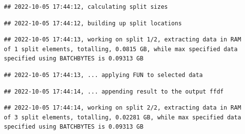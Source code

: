 \documentclass[
  12pt,
]{style/krantz}
\newenvironment{Shaded}{\begin{snugshade}}{\end{snugshade}}
\newcommand{\AttributeTok}[1]{\textcolor[rgb]{0.77,0.63,0.00}{#1}}
\newcommand{\CommentTok}[1]{\textcolor[rgb]{0.56,0.35,0.01}{\textit{#1}}}
\newcommand{\ConstantTok}[1]{\textcolor[rgb]{0.00,0.00,0.00}{#1}}
\newcommand{\ControlFlowTok}[1]{\textcolor[rgb]{0.13,0.29,0.53}{\textbf{#1}}}
\newcommand{\DecValTok}[1]{\textcolor[rgb]{0.00,0.00,0.81}{#1}}
\newcommand{\FunctionTok}[1]{\textcolor[rgb]{0.00,0.00,0.00}{#1}}
\newcommand{\NormalTok}[1]{#1}
\newcommand{\OtherTok}[1]{\textcolor[rgb]{0.56,0.35,0.01}{#1}}
\newcommand{\SpecialCharTok}[1]{\textcolor[rgb]{0.00,0.00,0.00}{#1}}
\begin{document}
\begin{Shaded}
\end{Shaded}

\begin{verbatim}
## 2022-10-05 17:44:12, calculating split sizes
\end{verbatim}

\begin{verbatim}
## 2022-10-05 17:44:12, building up split locations
\end{verbatim}

\begin{verbatim}
## 2022-10-05 17:44:13, working on split 1/2, extracting data in RAM of 1 split elements, totalling, 0.0815 GB, while max specified data specified using BATCHBYTES is 0.09313 GB
\end{verbatim}

\begin{verbatim}
## 2022-10-05 17:44:13, ... applying FUN to selected data
\end{verbatim}

\begin{verbatim}
## 2022-10-05 17:44:14, ... appending result to the output ffdf
\end{verbatim}

\begin{verbatim}
## 2022-10-05 17:44:14, working on split 2/2, extracting data in RAM of 3 split elements, totalling, 0.02281 GB, while max specified data specified using BATCHBYTES is 0.09313 GB
\end{verbatim}
\end{document}

